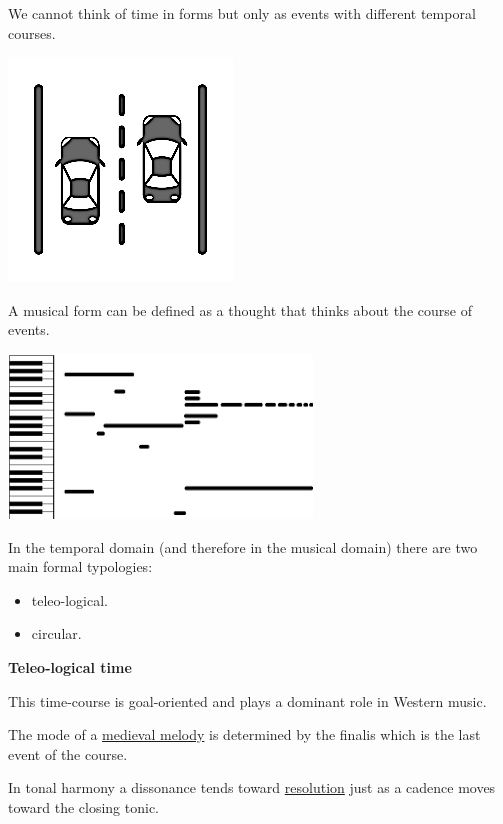 We cannot think of time in forms but only as events with different temporal courses.

\begin{center}
\includegraphics[scale=0.3]{../img/corsie.png}
\end{center}

A musical form can be defined as a thought that thinks about the course of events.

\begin{center}
\includegraphics[scale=0.7]{../img/pianoroll.png}
\end{center}

In the temporal domain (and therefore in the musical domain) there are two main formal typologies:

\begin{itemize}
\tightlist
\item teleo-logical.
\item circular.
\end{itemize}

\textbf{Teleo-logical time}\label{teleo-logical-time}

This time-course is goal-oriented and plays a dominant role in Western music.

The mode of a \href{https://github.com/musicaecodice/EMC/blob/main/3_fixed/suoni/finalis.mp3}{medieval melody} is determined by the finalis which is the last event of the course.

In tonal harmony a dissonance tends toward \href{https://github.com/musicaecodice/EMC/blob/main/3_fixed/suoni/risolvi.mp3}{resolution} just as a cadence moves toward the closing tonic.

